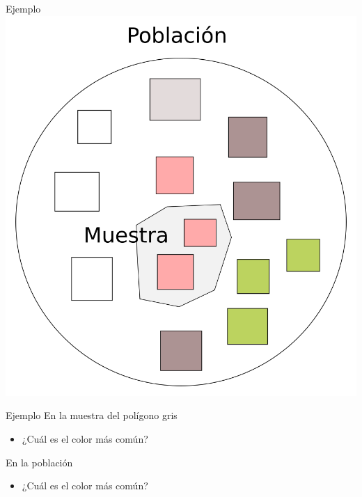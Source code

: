 \documentclass[
  11pt,
  ignorenonframetext,
]{beamer}
\providecommand{\tightlist}{%
  \setlength{\itemsep}{0pt}\setlength{\parskip}{0pt}}
\begin{document}
\begin{frame}{Ejemplo}
\protect\hypertarget{ejemplo}{}
\includegraphics{Figuras-poblacion/Sesgo-1.png}
\end{frame}

\begin{frame}{Ejemplo}
\protect\hypertarget{ejemplo-1}{}
En la muestra del polígono gris

\begin{itemize}
\tightlist
\item
  ¿Cuál es el color más común?
\end{itemize}

En la población

\begin{itemize}
\tightlist
\item
  ¿Cuál es el color más común?
\end{itemize}
\end{frame}
\end{document}
